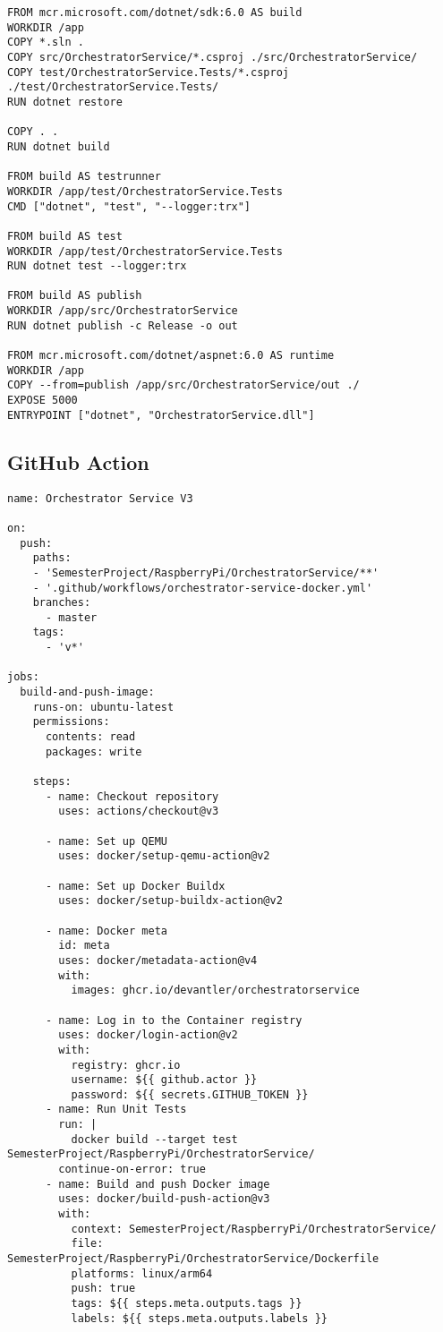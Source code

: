 \begin{verbatim}
FROM mcr.microsoft.com/dotnet/sdk:6.0 AS build
WORKDIR /app
COPY *.sln .
COPY src/OrchestratorService/*.csproj ./src/OrchestratorService/
COPY test/OrchestratorService.Tests/*.csproj ./test/OrchestratorService.Tests/
RUN dotnet restore

COPY . .
RUN dotnet build

FROM build AS testrunner
WORKDIR /app/test/OrchestratorService.Tests
CMD ["dotnet", "test", "--logger:trx"]

FROM build AS test
WORKDIR /app/test/OrchestratorService.Tests
RUN dotnet test --logger:trx

FROM build AS publish
WORKDIR /app/src/OrchestratorService
RUN dotnet publish -c Release -o out

FROM mcr.microsoft.com/dotnet/aspnet:6.0 AS runtime
WORKDIR /app
COPY --from=publish /app/src/OrchestratorService/out ./
EXPOSE 5000
ENTRYPOINT ["dotnet", "OrchestratorService.dll"]
\end{verbatim}

\subsection{GitHub Action}\label{appendix:orchestrator-updated-githubaction}

\begin{verbatim}
name: Orchestrator Service V3

on:
  push:
    paths:
    - 'SemesterProject/RaspberryPi/OrchestratorService/**'
    - '.github/workflows/orchestrator-service-docker.yml'
    branches:
      - master
    tags:
      - 'v*'
    
jobs:
  build-and-push-image:
    runs-on: ubuntu-latest
    permissions:
      contents: read
      packages: write

    steps:
      - name: Checkout repository
        uses: actions/checkout@v3
              
      - name: Set up QEMU
        uses: docker/setup-qemu-action@v2

      - name: Set up Docker Buildx
        uses: docker/setup-buildx-action@v2
        
      - name: Docker meta
        id: meta
        uses: docker/metadata-action@v4
        with:
          images: ghcr.io/devantler/orchestratorservice
        
      - name: Log in to the Container registry
        uses: docker/login-action@v2
        with:
          registry: ghcr.io
          username: ${{ github.actor }}
          password: ${{ secrets.GITHUB_TOKEN }}
      - name: Run Unit Tests
        run: |
          docker build --target test SemesterProject/RaspberryPi/OrchestratorService/
        continue-on-error: true
      - name: Build and push Docker image
        uses: docker/build-push-action@v3
        with:
          context: SemesterProject/RaspberryPi/OrchestratorService/
          file: SemesterProject/RaspberryPi/OrchestratorService/Dockerfile
          platforms: linux/arm64
          push: true
          tags: ${{ steps.meta.outputs.tags }}
          labels: ${{ steps.meta.outputs.labels }}
\end{verbatim}